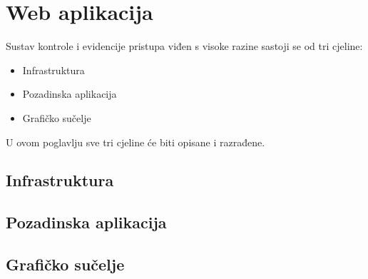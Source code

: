 \chapter{Web aplikacija}

Sustav kontrole i evidencije pristupa viđen s visoke razine sastoji se od tri cjeline:
\begin{itemize}
    \item Infrastruktura
    \item Pozadinska aplikacija
    \item Grafičko sučelje
\end{itemize}

U ovom poglavlju sve tri cjeline će biti opisane i razrađene.

\section{Infrastruktura}


\section{Pozadinska aplikacija}


\section{Grafičko sučelje}

